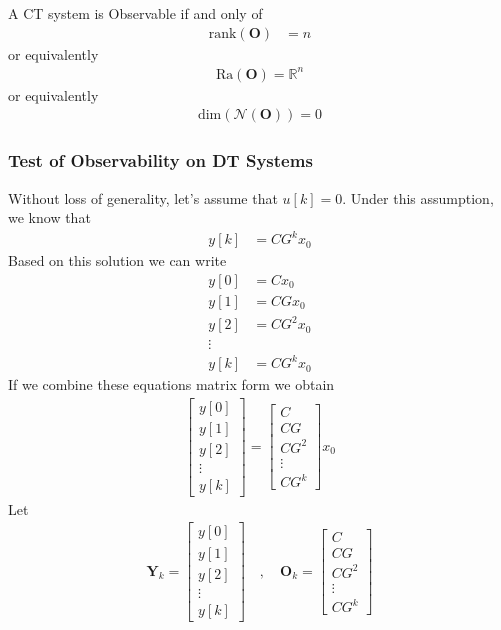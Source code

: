 \documentclass[twoside]{article}
\begin{document}
A CT system is Observable if and only of
%
\begin{align*}
  \mathrm{rank} ( \mathbf{O} ) &= n
\end{align*} 
%
or equivalently 
%
\begin{align*}
 \mathrm{Ra} ( \mathbf{O} ) = \mathbb{R}^n
\end{align*} 
%
or equivalently 
%
\begin{align*}
 \mathrm{dim} \left ( \mathcal{N} ( \mathbf{O} ) \right) = 0
\end{align*} 

\subsubsection*{Test of Observability on DT Systems}

Without loss of generality, let's assume that $u[k] =0$.
Under this assumption, we know that 
%
\begin{align*}
  y[k] &= C G^k x_0
\end{align*}
%
Based on this solution we can write
%
\begin{align*}
  y[0] &= C x_0
\\
  y[1] &= C G x_0
\\
  y[2] &= C G^2 x_0
\\
  \vdots
\\
 y[k] &= C G^k x_0
\end{align*}
%
If we combine these equations matrix form we obtain
%
\begin{align*}
\left[ \begin{array}{c}
  y[0] 
\\
  y[1] 
\\
  y[2] 
\\
  \vdots
\\
 y[k] 
\end{array}
\right]
=
\left[ \begin{array}{c}
C 
\\
C G 
\\
C G^2 
\\
  \vdots
\\
C G^k
\end{array}
\right]
x_0
\end{align*}
%
Let 
%
\begin{align*}
\mathbf{Y}_k =
\left[ \begin{array}{c}
  y[0] 
\\
  y[1] 
\\
  y[2] 
\\
  \vdots
\\
 y[k] 
\end{array}
\right]
\quad , \quad
\mathbf{O}_k =
\left[ \begin{array}{c}
C 
\\
C G 
\\
C G^2 
\\
  \vdots
\\
C G^k
\end{array}
\right]
\end{align*}
\end{document}
